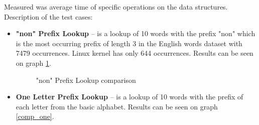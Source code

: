 
Measured was average time of specific operations on the data structures.
Description of the test cases:
\begin{itemize}
    \item \textbf{"non" Prefix Lookup} – is a lookup of 10 words with the prefix "non" which is the most occurring prefix
    of length 3 in the English words dataset with 7479 occurrences. Linux kernel has only 644 occurrences. Results can be seen
    on graph \ref{comp_non}.

    \begin{figure}[htbp]
        \centering
        \caption{"non" Prefix Lookup comparison}
        \label{comp_non}
    \end{figure}
    \item \textbf{One Letter Prefix Lookup} – is a lookup of 10 words with the prefix of each letter from the basic alphabet.
    Results can be seen on graph \ref{comp_one}.


\end{itemize}
